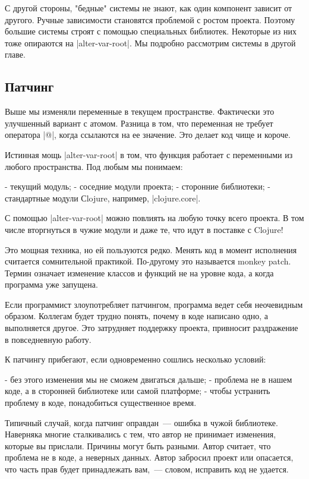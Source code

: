 С другой стороны, "бедные" системы не знают, как один компонент зависит от
другого. Ручные зависимости становятся проблемой с ростом проекта. Поэтому
большие системы строят с помощью специальных библиотек. Некоторые из них тоже
опираются на \spverb|alter-var-root|. Мы подробно рассмотрим системы в другой главе.

\subsection{Патчинг}

Выше мы изменяли переменные в текущем пространстве. Фактически это улучшенный
вариант с атомом. Разница в том, что переменная не требует оператора \spverb|@|, когда
ссылаются на ее значение. Это делает код чище и короче.

Истинная мощь \spverb|alter-var-root| в том, что функция работает с переменными из
любого пространства. Под любым мы понимаем:

- текущий модуль;
- соседние модули проекта;
- сторонние библиотеки;
- стандартные модули Сlojure, например, \spverb|clojure.core|.

С помощью \spverb|alter-var-root| можно повлиять на любую точку всего проекта. В том
числе вторгнуться в чужие модули и даже те, что идут в поставке с Clojure!

Это мощная техника, но ей пользуются редко. Менять код в момент исполнения
считается сомнительной практикой. По-другому это называется monkey patch. Термин
означает изменение классов и функций не на уровне кода, а когда программа уже
запущена.

Если программист злоупотребляет патчингом, программа ведет себя неочевидным
образом. Коллегам будет трудно понять, почему в коде написано одно, а
выполняется другое. Это затрудняет поддержку проекта, привносит раздражение в
повседневную работу.

К патчингу прибегают, если одновременно сошлись несколько условий:

- без этого изменения мы не сможем двигаться дальше;
- проблема не в нашем коде, а в сторонней библиотеке или самой платформе;
- чтобы устранить проблему в коде, понадобиться существенное время.

Типичный случай, когда патчинг оправдан~--- ошибка в чужой библиотеке. Наверняка
многие сталкивались с тем, что автор не принимает изменения, которые вы
прислали. Причины могут быть разными. Автор считает, что проблема не в коде, а
неверных данных. Автор забросил проект или опасается, что часть прав будет
принадлежать вам,~--- словом, исправить код не удается.

